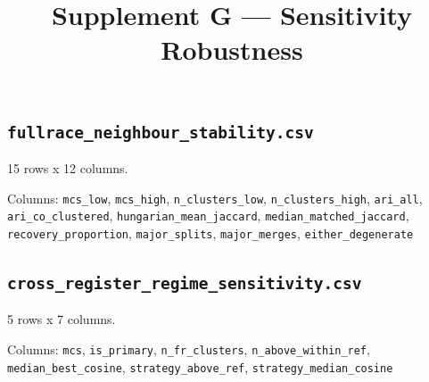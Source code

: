 \documentclass[10pt,a4paper]{article}
\title{\vspace{-14mm}\large Supplement G --- Sensitivity Robustness}
\author{}\date{}
\begin{document}
\maketitle\thispagestyle{fancy}
\subsection*{\texttt{fullrace\_\allowbreak{}neighbour\_\allowbreak{}stability.csv}}
15 rows x 12 columns.

{\raggedright Columns: \texttt{mcs\_\allowbreak{}low}, \texttt{mcs\_\allowbreak{}high}, \texttt{n\_\allowbreak{}clusters\_\allowbreak{}low}, \texttt{n\_\allowbreak{}clusters\_\allowbreak{}high}, \texttt{ari\_\allowbreak{}all}, \texttt{ari\_\allowbreak{}co\_\allowbreak{}clustered}, \texttt{hungarian\_\allowbreak{}mean\_\allowbreak{}jaccard}, \texttt{median\_\allowbreak{}matched\_\allowbreak{}jaccard}, \texttt{recovery\_\allowbreak{}proportion}, \texttt{major\_\allowbreak{}splits}, \texttt{major\_\allowbreak{}merges}, \texttt{either\_\allowbreak{}degenerate}\par}

\subsection*{\texttt{cross\_\allowbreak{}register\_\allowbreak{}regime\_\allowbreak{}sensitivity.csv}}
5 rows x 7 columns.

{\raggedright Columns: \texttt{mcs}, \texttt{is\_\allowbreak{}primary}, \texttt{n\_\allowbreak{}fr\_\allowbreak{}clusters}, \texttt{n\_\allowbreak{}above\_\allowbreak{}within\_\allowbreak{}ref}, \texttt{median\_\allowbreak{}best\_\allowbreak{}cosine}, \texttt{strategy\_\allowbreak{}above\_\allowbreak{}ref}, \texttt{strategy\_\allowbreak{}median\_\allowbreak{}cosine}\par}
\end{document}
